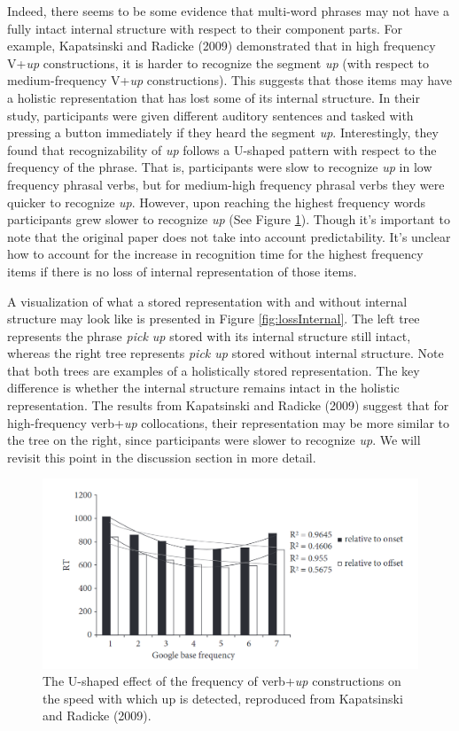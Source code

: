 \documentclass[
  man,floatsintext]{apa6}
\begin{document}
Indeed, there seems to be some evidence that multi-word phrases may not have a fully intact internal structure with respect to their component parts. For example, Kapatsinski and Radicke (2009) demonstrated that in high frequency V+\emph{up} constructions, it is harder to recognize the segment \emph{up} (with respect to medium-frequency V+\emph{up} constructions). This suggests that those items may have a holistic representation that has lost some of its internal structure. In their study, participants were given different auditory sentences and tasked with pressing a button immediately if they heard the segment \emph{up}. Interestingly, they found that recognizability of \emph{up} follows a U-shaped pattern with respect to the frequency of the phrase. That is, participants were slow to recognize \emph{up} in low frequency phrasal verbs, but for medium-high frequency phrasal verbs they were quicker to recognize \emph{up}. However, upon reaching the highest frequency words participants grew slower to recognize \emph{up} (See Figure \ref{fig:kapatsinskiplot}). Though it's important to note that the original paper does not take into account predictability. It's unclear how to account for the increase in recognition time for the highest frequency items if there is no loss of internal representation of those items.

A visualization of what a stored representation with and without internal structure may look like is presented in Figure \ref{fig:lossInternal}. The left tree represents the phrase \emph{pick up} stored with its internal structure still intact, whereas the right tree represents \emph{pick up} stored without internal structure. Note that both trees are examples of a holistically stored representation. The key difference is whether the internal structure remains intact in the holistic representation. The results from Kapatsinski and Radicke (2009) suggest that for high-frequency verb+\emph{up} collocations, their representation may be more similar to the tree on the right, since participants were slower to recognize \emph{up}. We will revisit this point in the discussion section in more detail.



\begin{figure}

{\centering \includegraphics[width=0.7\linewidth]{Figures/kapatsinskiradicke_graph} 

}

\caption{The U-shaped effect of the frequency of verb+\emph{up} constructions on the speed with which up is detected, reproduced from Kapatsinski and Radicke (2009).}\label{fig:kapatsinskiplot}
\end{figure}
\end{document}
